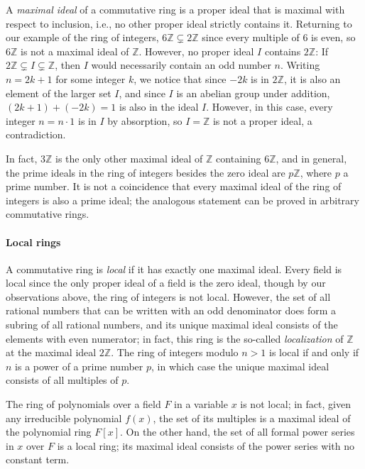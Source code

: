 \documentclass[referee,sn-mathphys]{sn-jnl}
\theoremstyle{definition}
\theoremstyle{remark}
\numberwithin{equation}{section}
\numberwithin{figure}{subsection}
\begin{document}
A \emph{maximal ideal} of a commutative ring is a proper ideal that is maximal
with respect to inclusion, i.e., no other proper ideal strictly contains it. 
Returning to our example of the ring of integers,
$6 \mathbb{Z} \subsetneq 2 \mathbb{Z}$ since every multiple of $6$ is even, so
$6 \mathbb{Z}$ is not a maximal ideal of $\mathbb{Z}$. However, no proper ideal
$I$ contains $2 \mathbb{Z}$: If $2\mathbb{Z}\subsetneq I\subsetneq \mathbb{Z}$,
then $I$  would necessarily contain an odd number $n$. Writing $n=2k+1$ for
some integer $k$, we notice that since $-2k$ is in $2\mathbb{Z}$, it is also an
element of the larger set $I$, and since $I$ is an abelian group under
addition, $(2k+1) + (-2k) = 1$ is also in the ideal $I$. However, in this case,
every integer $n = n \cdot 1$ is in $I$ by absorption, so $I = \mathbb{Z}$ is
not a proper ideal, a contradiction. 

In fact, $3 \mathbb{Z}$ is the only other maximal ideal of $\mathbb{Z}$
containing $6 \mathbb{Z}$, and in general, the prime ideals in the ring of
integers besides the zero ideal are  $p \mathbb{Z}$, where $p$ a prime number. 
It is not a coincidence that every maximal ideal of the ring of integers is
also a prime  ideal; the analogous statement can be proved in arbitrary
commutative rings.

\paragraph{Local rings}
A commutative ring is \emph{local} if it has exactly one maximal ideal. 
Every field is local since the only proper ideal of a field is the zero ideal,
though by our observations above, the ring of integers is not local. 
However, the set of all rational numbers that can be written with an odd
denominator does form a subring of all rational numbers, and its unique maximal
ideal consists of the elements with even numerator; in fact, this ring is the
so-called \emph{localization} of $\mathbb{Z}$ at the maximal ideal
$2\mathbb{Z}$. The ring of integers modulo $n>1$ is local if and only if $n$ is
a power of a prime number $p$, in which case the unique maximal ideal consists
of all multiples of $p$. 

The ring of polynomials over a field $F$ in a variable $x$ is not local; in
fact, given any irreducible polynomial $f(x)$, the set of its multiples is a
maximal ideal of the polynomial ring $F[x]$. On the other hand, the set of all
formal power series  in $x$ over $F$ is a local ring; its maximal ideal
consists of the power series with no constant term. 
\end{document}
